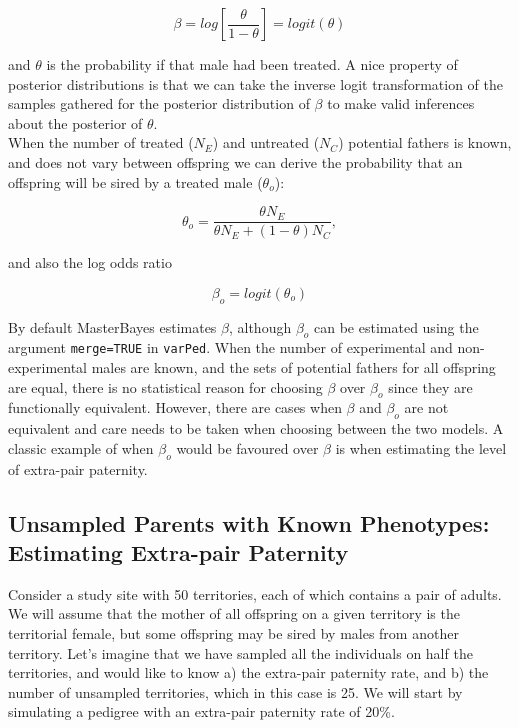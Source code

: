 \documentclass{article}
\begin{document}
\begin{equation}
\beta  = log\left[\frac{\theta}{1-\theta}\right] = logit(\theta)
\end{equation}

and $\theta$ is the probability if that male had been treated. A nice property of posterior distributions is that we can take the inverse logit transformation of the samples gathered for the posterior distribution of $\beta$ to make valid inferences about the posterior of $\theta$.\\

When the number of treated ($N_{E}$) and untreated ($N_{C}$) potential fathers is known, and does not vary between offspring we can derive the probability that an offspring will be sired by a treated male ($\theta_{o}$):

\begin{equation}
\theta_{o}  = \frac{\theta N_{E}}{\theta N_{E} + (1-\theta)N_{C}},  
\label{eq_thetao}
\end{equation}

and also the log odds ratio

\begin{equation}
\beta_{o}  = logit(\theta_{o})
\end{equation}

By default MasterBayes estimates $\beta$, although $\beta_{o}$ can be estimated using the argument \texttt{merge=TRUE} in \texttt{varPed}.  When the number of experimental and non-experimental males are known, and the sets of potential fathers for all offspring are equal, there is no statistical reason for choosing $\beta$ over $\beta_{o}$ since they are functionally equivalent.  However, there are cases when $\beta$ and $\beta_{o}$ are not equivalent and care needs to be taken when choosing between the two models.  A classic example of when  $\beta_{o}$ would be favoured over $\beta$ is when estimating the level of extra-pair paternity.
 


\subsection{Unsampled Parents with Known Phenotypes: Estimating Extra-pair Paternity}
\label{EPP-sec}

Consider a study site with 50 territories, each of which contains a pair of adults.  We will assume that the mother of all offspring on a given territory is the territorial female, but some offspring may be sired by males from another territory.  Let's imagine that we have sampled all the individuals on half the territories, and would like to know a) the extra-pair paternity rate, and b) the number of unsampled territories, which in this case is 25. We will start by simulating a pedigree with an extra-pair paternity rate of 20\%.
\end{document}
